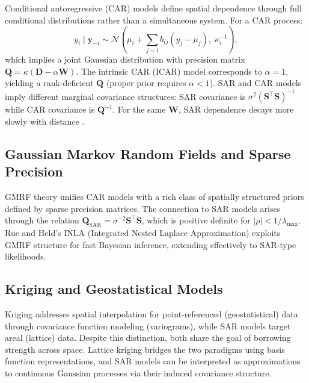 \documentclass[conference]{IEEEtran}
\theoremstyle{definition}
\begin{document}
Conditional autoregressive (CAR) models \cite{besag1974spatial} define spatial dependence through full conditional distributions rather than a simultaneous system. For a CAR process:
\begin{equation}
y_i \mid \mathbf{y}_{-i} \sim \mathcal{N}\!\left(\mu_i + \sum_{j \sim i} b_{ij}(y_j - \mu_j),\; \kappa_i^{-1}\right),
\end{equation}
which implies a joint Gaussian distribution with precision matrix $\mathbf{Q} = \kappa(\mathbf{D} - \alpha\mathbf{W})$. The intrinsic CAR (ICAR) model corresponds to $\alpha = 1$, yielding a rank-deficient $\mathbf{Q}$ (proper prior requires $\alpha < 1$). SAR and CAR models imply different marginal covariance structures: SAR covariance is $\sigma^2(\mathbf{S}^\top\mathbf{S})^{-1}$ while CAR covariance is $\mathbf{Q}^{-1}$. For the same $\mathbf{W}$, SAR dependence decays more slowly with distance \cite{wall2004close}.

\subsection{Gaussian Markov Random Fields and Sparse Precision}

GMRF theory \cite{rue2005gaussian} unifies CAR models with a rich class of spatially structured priors defined by sparse precision matrices. The connection to SAR models arises through the relation $\mathbf{Q}_{\text{SAR}} = \sigma^{-2}\mathbf{S}^\top\mathbf{S}$, which is positive definite for $|\rho| < 1/\lambda_{\max}$. Rue and Held's INLA (Integrated Nested Laplace Approximation) \cite{rue2009approximate} exploits GMRF structure for fast Bayesian inference, extending effectively to SAR-type likelihoods.

\subsection{Kriging and Geostatistical Models}

Kriging \cite{cressie1993statistics} addresses spatial interpolation for point-referenced (geostatistical) data through covariance function modeling (variograms), while SAR models target areal (lattice) data. Despite this distinction, both share the goal of borrowing strength across space. Lattice kriging \cite{nychka2015multiresolution} bridges the two paradigms using basis function representations, and SAR models can be interpreted as approximations to continuous Gaussian processes via their induced covariance structure.
\end{document}

